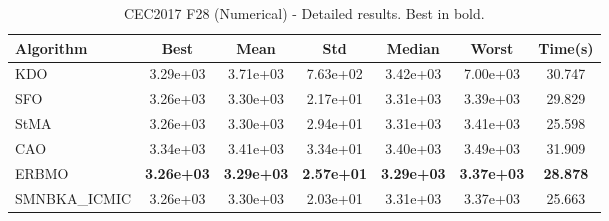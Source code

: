 \begin{table}[H]
\centering\small
\caption{CEC2017 F28 (Numerical) - Detailed results. Best in bold.}
\label{tab:cec2017_F28}
\begin{tabular}{lcccccc}
\toprule
\textbf{Algorithm} & \textbf{Best} & \textbf{Mean} & \textbf{Std} & \textbf{Median} & \textbf{Worst} & \textbf{Time(s)} \\
\midrule
KDO & 3.29e+03 & 3.71e+03 & 7.63e+02 & 3.42e+03 & 7.00e+03 & 30.747 \\
SFO & 3.26e+03 & 3.30e+03 & 2.17e+01 & 3.31e+03 & 3.39e+03 & 29.829 \\
StMA & 3.26e+03 & 3.30e+03 & 2.94e+01 & 3.31e+03 & 3.41e+03 & 25.598 \\
CAO & 3.34e+03 & 3.41e+03 & 3.34e+01 & 3.40e+03 & 3.49e+03 & 31.909 \\
ERBMO & \textbf{3.26e+03} & \textbf{3.29e+03} & \textbf{2.57e+01} & \textbf{3.29e+03} & \textbf{3.37e+03} & \textbf{28.878} \\
SMNBKA_ICMIC & 3.26e+03 & 3.30e+03 & 2.03e+01 & 3.31e+03 & 3.37e+03 & 25.663 \\
\bottomrule
\end{tabular}
\end{table}
